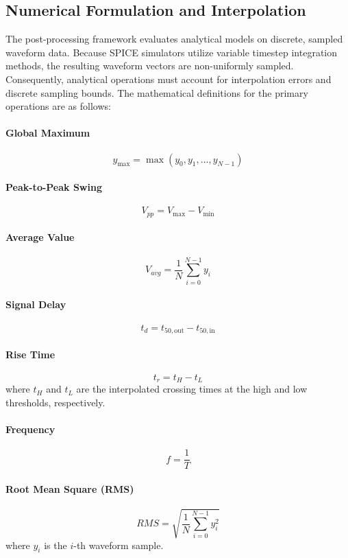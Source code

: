 \subsection{Numerical Formulation and Interpolation}
\label{sec:pp-mathmodels}

The post-processing framework evaluates analytical models on discrete, sampled waveform data. Because SPICE simulators utilize variable timestep integration methods, the resulting waveform vectors are non-uniformly sampled. Consequently, analytical operations must account for interpolation errors and discrete sampling bounds. The mathematical definitions for the primary operations are as follows:

\paragraph{Global Maximum}
\[
y_{\max} = \max(y_0, y_1, \dots, y_{N-1})
\]

\paragraph{Peak-to-Peak Swing}
\[
V_{pp} = V_{\max} - V_{\min}
\]

\paragraph{Average Value}
\[
V_{avg} = \frac{1}{N} \sum_{i=0}^{N-1} y_i
\]

\paragraph{Signal Delay}
\[
t_d = t_{50,\text{out}} - t_{50,\text{in}}
\]

\paragraph{Rise Time}
\[
t_r = t_{H} - t_{L}
\]
where $t_H$ and $t_L$ are the interpolated crossing times at the high and low thresholds, respectively.

\paragraph{Frequency}
\[
f = \frac{1}{T}
\]

\paragraph{Root Mean Square (RMS)}
\[
RMS = \sqrt{\frac{1}{N} \sum_{i=0}^{N-1} y_i^2}
\]
where $y_i$ is the $i$-th waveform sample.

